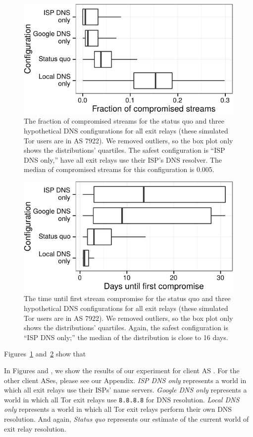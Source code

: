 \begin{figure}[t]
\centering
\includegraphics[width=0.75\linewidth]{figures/differences-comp-streams.pdf}
\caption{The fraction of compromised streams for the status quo and three
hypothetical DNS configurations for all exit relays (these simulated Tor users 
are in AS 7922).  
We removed outliers, so 
the box plot only shows the distributions' quartiles.  The safest configuration
is ``ISP DNS only,'' \ie have all exit relays use their ISP's DNS resolver.  The
median of compromised streams for this configuration is 0.005.}
\label{fig:compromised-streams}
\end{figure}

\begin{figure}[t]
\centering
\includegraphics[width=0.75\linewidth]{figures/differences-time-comp.pdf}
\caption{The time until first stream compromise for the status quo and three
hypothetical DNS configurations for all exit relays (these simulated Tor users 
are in AS 7922).  
We removed outliers, so 
the box plot only shows the distributions' quartiles.  Again, the safest
configuration is ``ISP DNS only;'' the median of the distribution is
close to 16 days.}
\label{fig:time-until-compromise}
\end{figure}

Figures~\ref{fig:compromised-streams}
and~\ref{fig:time-until-compromise} show that

In Figures  and , we show the results of our experiment for client 
AS .  For the other client ASes, please see our Appendix. 
\emph{ISP DNS only} represents a world in which all exit relays use 
their ISPs' name servers. \emph{Google DNS only} represents a world in which all 
Tor exit relays use {\tt 8.8.8.8} for DNS resolution.  \emph{Local DNS only} represents 
a world in which all Tor exit relays perform their own DNS resolution.  And again, 
\emph{Status quo} represents our estimate of the current world of exit relay resolution.  

